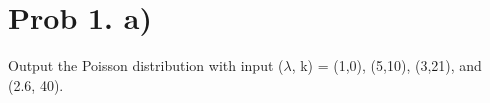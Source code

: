 \section{Prob 1. a)}



Output the Poisson distribution with input ($\lambda$, k) = (1,0), (5,10), (3,21), and (2.6, 40). 


